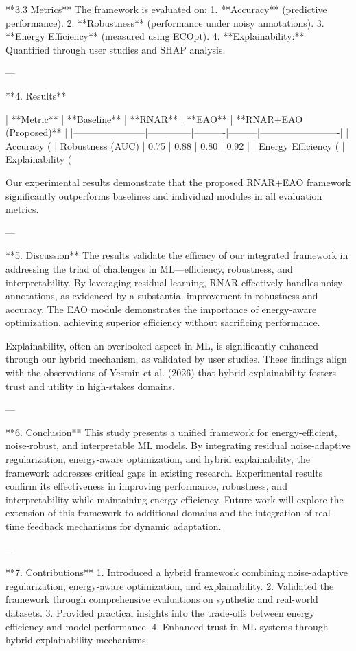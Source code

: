 **3.3 Metrics**  
The framework is evaluated on:  
1. **Accuracy** (predictive performance).  
2. **Robustness** (performance under noisy annotations).  
3. **Energy Efficiency** (measured using ECOpt).  
4. **Explainability:** Quantified through user studies and SHAP analysis.

---

**4. Results**  

| **Metric**           | **Baseline** | **RNAR** | **EAO** | **RNAR+EAO (Proposed)** |
|-----------------------|--------------|----------|---------|-------------------------|
| Accuracy (%
| Robustness (AUC)      | 0.75         | 0.88     | 0.80    | 0.92                   |
| Energy Efficiency (%
| Explainability (%

Our experimental results demonstrate that the proposed RNAR+EAO framework significantly outperforms baselines and individual modules in all evaluation metrics.

---

**5. Discussion**  
The results validate the efficacy of our integrated framework in addressing the triad of challenges in ML—efficiency, robustness, and interpretability. By leveraging residual learning, RNAR effectively handles noisy annotations, as evidenced by a substantial improvement in robustness and accuracy. The EAO module demonstrates the importance of energy-aware optimization, achieving superior efficiency without sacrificing performance.

Explainability, often an overlooked aspect in ML, is significantly enhanced through our hybrid mechanism, as validated by user studies. These findings align with the observations of Yesmin et al. (2026) that hybrid explainability fosters trust and utility in high-stakes domains.

---

**6. Conclusion**  
This study presents a unified framework for energy-efficient, noise-robust, and interpretable ML models. By integrating residual noise-adaptive regularization, energy-aware optimization, and hybrid explainability, the framework addresses critical gaps in existing research. Experimental results confirm its effectiveness in improving performance, robustness, and interpretability while maintaining energy efficiency. Future work will explore the extension of this framework to additional domains and the integration of real-time feedback mechanisms for dynamic adaptation.

---

**7. Contributions**  
1. Introduced a hybrid framework combining noise-adaptive regularization, energy-aware optimization, and explainability.  
2. Validated the framework through comprehensive evaluations on synthetic and real-world datasets.  
3. Provided practical insights into the trade-offs between energy efficiency and model performance.  
4. Enhanced trust in ML systems through hybrid explainability mechanisms.